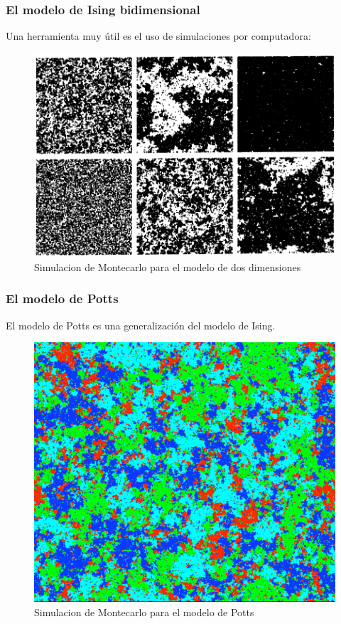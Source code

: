 \documentclass{beamer}
\begin{document}
\begin{frame}
\frametitle{El modelo de Ising bidimensional}
Una herramienta muy útil es el uso de simulaciones por computadora: 
%
\begin{figure}
\centering
\includegraphics[scale=0.27]{fig/isingresult.png}
\caption{Simulacion de Montecarlo para el modelo de dos dimensiones}
\end{figure}

\end{frame}

\begin{frame}
\frametitle{El modelo de Potts}

El modelo de Potts es una generalización del modelo de Ising. 

\begin{figure}
\centering
\includegraphics[scale=0.27]{fig/potts.png}
\caption{Simulacion de Montecarlo para el modelo de Potts}
\end{figure}
  

\end{frame}
\end{document}
